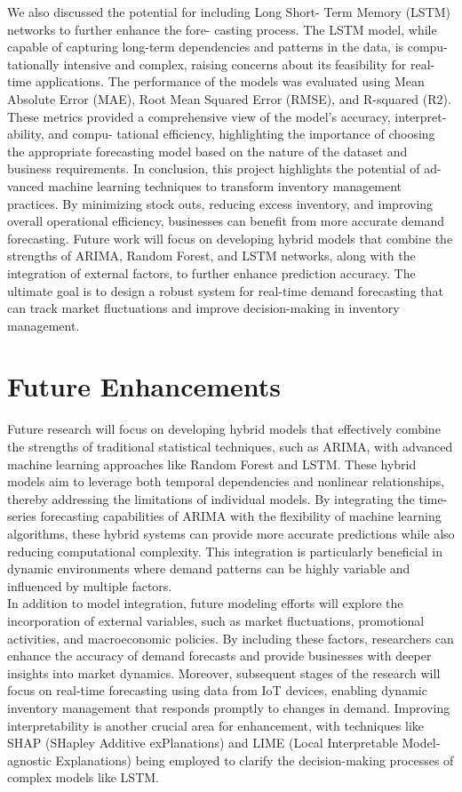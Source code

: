 \documentclass[10pt]{report}
\begin{document}
\begin{center}
We also discussed the potential for including Long Short-
Term Memory (LSTM) networks to further enhance the fore-
casting process. The LSTM model, while capable of capturing
long-term dependencies and patterns in the data, is compu-
tationally intensive and complex, raising concerns about its
feasibility for real-time applications.
The performance of the models was evaluated using Mean
Absolute Error (MAE), Root Mean Squared Error (RMSE),
and R-squared (R2). These metrics provided a comprehensive
view of the model’s accuracy, interpret-ability, and compu-
tational efficiency, highlighting the importance of choosing
the appropriate forecasting model based on the nature of the
dataset and business requirements.
In conclusion, this project highlights the potential of ad-
vanced machine learning techniques to transform inventory
management practices. By minimizing stock outs, reducing
excess inventory, and improving overall operational efficiency,
businesses can benefit from more accurate demand forecasting.
Future work will focus on developing hybrid models that
combine the strengths of ARIMA, Random Forest, and LSTM
networks, along with the integration of external factors, to
further enhance prediction accuracy. The ultimate goal is to
design a robust system for real-time demand forecasting that
can track market fluctuations and improve decision-making in
inventory management.

\section{Future Enhancements}
Future research will focus on developing hybrid models that effectively combine the strengths of traditional statistical techniques, such as ARIMA, with advanced machine learning approaches like Random Forest and LSTM. These hybrid models aim to leverage both temporal dependencies and nonlinear relationships, thereby addressing the limitations of individual models. By integrating the time-series forecasting capabilities of ARIMA with the flexibility of machine learning algorithms, these hybrid systems can provide more accurate predictions while also reducing computational complexity. This integration is particularly beneficial in dynamic environments where demand patterns can be highly variable and influenced by multiple factors.\\

In addition to model integration, future modeling efforts will explore the incorporation of external variables, such as market fluctuations, promotional activities, and macroeconomic policies. By including these factors, researchers can enhance the accuracy of demand forecasts and provide businesses with deeper insights into market dynamics. Moreover, subsequent stages of the research will focus on real-time forecasting using data from IoT devices, enabling dynamic inventory management that responds promptly to changes in demand. Improving interpretability is another crucial area for enhancement, with techniques like SHAP (SHapley Additive exPlanations) and LIME (Local Interpretable Model-agnostic Explanations) being employed to clarify the decision-making processes of complex models like LSTM. 


\end{center}
\end{document}
